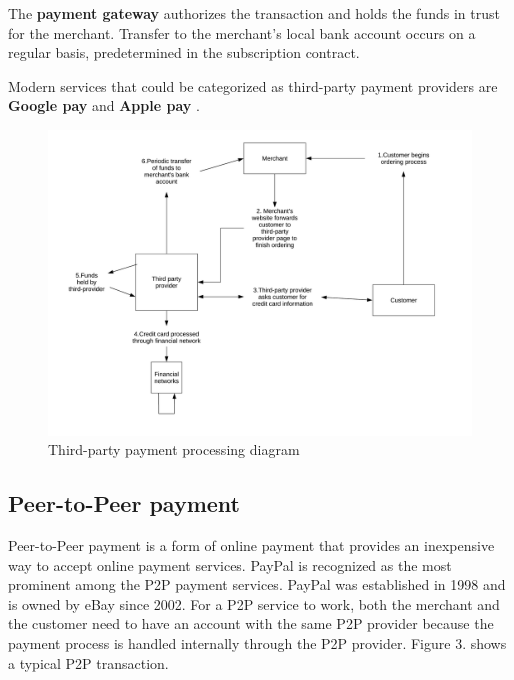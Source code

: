 \documentclass{ferseminar}
\begin{document}
The \textbf{payment gateway} authorizes the transaction and holds the funds in trust for the merchant. Transfer to the merchant's local bank account occurs on a regular basis, predetermined in the subscription contract.

Modern services that could be categorized as third-party payment providers are \textbf{Google pay} and \textbf{Apple pay} \cite{Google}.

\begin{figure}[t]
	\caption{Third-party payment processing diagram}
	\includegraphics[scale=0.6]{diagram2}
	\centering
\end{figure}

\subsection{Peer-to-Peer payment}

Peer-to-Peer payment is a form of online payment that provides an inexpensive way to accept online payment services. PayPal is recognized as the most prominent among the P2P payment services. PayPal was established in 1998 and is owned by eBay since 2002. For a P2P service to work, both the merchant and the customer need to have an account with the same P2P provider because the payment process is handled internally through the P2P provider. Figure 3. shows a typical P2P transaction.
\end{document}
